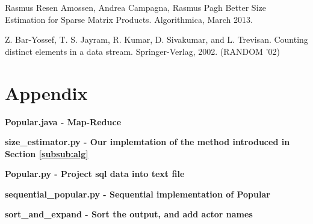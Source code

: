 \documentclass[a4paper,11pt]{article}
\begin{document}
\newpage

\begin{thebibliography}{}

Rasmus Resen Amossen, Andrea Campagna, Rasmus Pagh
Better Size Estimation for Sparse Matrix Products. Algorithmica, March 2013.

Z. Bar-Yossef, T. S. Jayram, R. Kumar, D. Sivakumar, and L. Trevisan.
Counting distinct elements in a data stream. Springer-Verlag, 2002. (RANDOM '02)

\end{thebibliography}

\section*{Appendix}
\textbf{Popular.java - Map-Reduce}

\textbf{size\_estimator.py - Our implemtation of the method introduced in Section \ref{subsub:alg}}

\textbf{Popular.py - Project sql data into text file}

\textbf{sequential\_popular.py - Sequential implementation of Popular}

\textbf{sort\_and\_expand - Sort the output, and add actor names}

\end{document}
